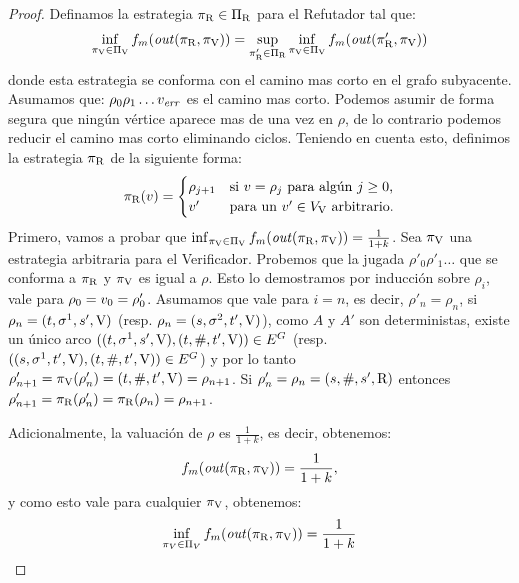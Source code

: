 \begin{proof}
	Definamos la estrategia $\pi_{\mathrm{R}} \in \Pi_{\mathrm{R}}$ para el Refutador tal que:
\[
	\inf_{\pi_{\mathrm{V}} \in \Pi_{\mathrm{V}}} f_m(\mathit{out}(\pi_{\mathrm{R}}, \pi_{\mathrm{V}})) = \sup_{\pi_{\mathrm{R}}' \in \Pi_{\mathrm{R}}} \inf_{\pi_{\mathrm{V}} \in \Pi_{\mathrm{V}}} f_m( \mathit{out}(\pi_{\mathrm{R}}',\pi_{\mathrm{V}}))
\]	
	donde esta estrategia se conforma con el camino mas corto en el grafo subyacente. Asumamos que: 
$\rho_0 \rho_1 \dots v_{\mathit{err}}$ es el camino mas corto. Podemos asumir de forma segura que ningún vértice aparece mas de una vez en $\rho$, de lo contrario podemos reducir el camino mas corto eliminando ciclos.
	Teniendo en cuenta esto, definimos la estrategia $\pi_{\mathrm{R}}$ de la siguiente forma:
\[
	\pi_{\mathrm{R}}(v) = \begin{cases}
								\rho_{j+1} & \text{si $v = \rho_j$ para algún $j \geq 0$,} \\
								v' & \text{para un $v' \in V_{\mathrm{V}}$ arbitrario.}
						   \end{cases}
\] 
Primero, vamos a probar que $\inf_{\pi_{\mathrm{V}} \in \Pi_{\mathrm{V}}} f_m (\mathit{out}(\pi_{\mathrm{R}}, \pi_{\mathrm{V}})) = \frac{1}{1+k}$. Sea $\pi_{\mathrm{V}}$ una estrategia arbitraria para el Verificador. Probemos que la jugada $\rho'_0 \rho'_1 \dots$ que se conforma a $\pi_{\mathrm{R}}$ y $\pi_{\mathrm{V}}$ es igual a $\rho$. Esto lo demostramos por inducción sobre $\rho_i$, vale para $\rho_0 = v_0 = \rho'_0$. Asumamos que vale para $i=n$, es decir, $\rho'_n = \rho_n$, si $\rho_n = (t, \sigma^1, s', \mathrm{V})$ (resp.  $\rho_n = (s, \sigma^2, t', \mathrm{V})$), como $A$ y $A'$ son deterministas, existe un único arco $((t, \sigma^1, s', \mathrm{V}), (t, \#, t', \mathrm{V})) \in E^G$ (resp. $((s, \sigma^1, t', \mathrm{V}), (t, \#, t', \mathrm{V})) \in E^G$) y por lo tanto  $\rho'_{n+1} = \pi_{\mathrm{V}}( \rho'_n) = (t, \#, t', \mathrm{V}) = \rho_{n+1}$. Si 
$\rho'_n = \rho_n = (s, \#, s', \mathrm{R})$ entonces $\rho'_{n+1} = \pi_{\mathrm{R}}(\rho'_n) = \pi_{\mathrm{R}}(\rho_n) = \rho_{n+1}$. 
	
	Adicionalmente, la valuación de $\rho$ es $\frac{1}{1+k}$, es decir, obtenemos:
\begin{equation} \label{eq1}
\begin{split}
 f_m (\mathit{out}(\pi_{\mathrm{R}}, \pi_{\mathrm{V}}))  =  \frac{1}{1+k},
\end{split}
\end{equation}	
y como esto vale para cualquier $\pi_{\mathrm{V}}$, obtenemos:
\begin{equation} \label{eq1}
\begin{split}
\inf_{\pi_V \in \Pi_V} f_m (\mathit{out}(\pi_{\mathrm{R}}, \pi_{\mathrm{V}}))  =  \frac{1}{1+k}
\end{split}
\end{equation}


\end{proof}
